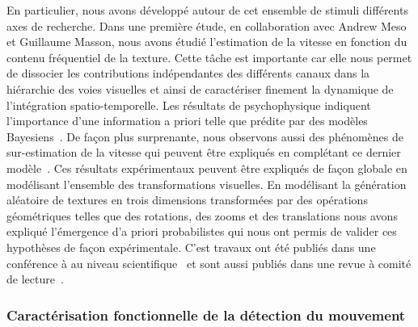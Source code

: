 En particulier, nous avons développé autour de cet ensemble de stimuli différents axes de recherche. Dans une première étude, en collaboration avec Andrew Meso et Guillaume Masson, nous avons étudié l'estimation de la vitesse en fonction du contenu fréquentiel de la texture. Cette tâche est importante car elle nous permet de dissocier les contributions indépendantes des différents canaux dans la hiérarchie des voies visuelles et ainsi de caractériser finement la dynamique de l'intégration spatio-temporelle. Les résultats de psychophysique indiquent l'importance d'une information a priori telle que prédite par des modèles Bayesiens~\citep{Stocker06}. De façon plus surprenante, nous observons aussi des phénomènes de sur-estimation de la vitesse qui peuvent être expliqués en complétant ce dernier modèle~\citep{Meso13vss,Meso14vss,Vacher15nips}. Ces résultats expérimentaux peuvent être expliqués de façon globale en modélisant l'ensemble des transformations visuelles.
En modélisant la génération aléatoire de  textures en trois dimensions transformées par des opérations géométriques telles que des rotations, des zooms et des translations nous avons expliqué l'émergence d'a priori probabilistes qui nous ont permis de valider ces hypothèses de façon expérimentale. C'est travaux ont été publiés dans une conférence à au niveau scientifique~\citep{Vacher15nips} et sont aussi publiés dans une revue à comité de lecture~\citep{Vacher16}.


\subsubsection{Caractérisation fonctionnelle de la détection du mouvement~\citep{Ravello19}}%

